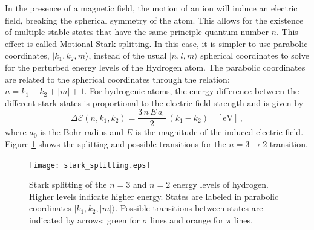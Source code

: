 In the presence of a magnetic field, the motion of an ion will induce an electric field, breaking the spherical symmetry of the atom.
This allows for the existence of multiple stable states that have the same principle quantum number $n$.
This effect is called Motional Stark splitting.
In this case, it is simpler to use parabolic coordinates, $|k_1,k_2,m\rangle$, instead of the usual $|n,l,m\rangle$ spherical coordinates to solve for the perturbed energy levels of the Hydrogen atom. The parabolic coordinates are related to the spherical coordinates through the relation: $n = k_1 + k_2 + |m| + 1$.
For hydrogenic atoms, the energy difference between the different stark states is proportional to the electric field strength and is given by
\begin{equation}\label{eq:stark_splitting}
    \Delta \mathcal{E}(n,k_1,k_2) = \frac{3\,n\,E\,a_0}{2}\,(k_1 - k_2) \quad [\mathrm{eV}]\,,
\end{equation}
where $a_0$ is the Bohr radius and $E$ is the magnitude of the induced electric field\cite{bethe&salpeter}. Figure \ref{fig:stark_splitting} shows the splitting and possible transitions for the $n=3\rightarrow2$ transition.
\begin{figure}[ht]
    \centering
    \texttt{[image: stark\_splitting.eps]}
    \caption{Stark splitting of the $n=3$ and $n=2$ energy levels of hydrogen. Higher levels indicate higher energy. States are labeled in parabolic coordinates $|k_1,k_2,|m|\rangle$. Possible transitions between states are indicated by arrows: green for $\sigma$ lines and orange for $\pi$ lines.}
    \label{fig:stark_splitting}
\end{figure}

